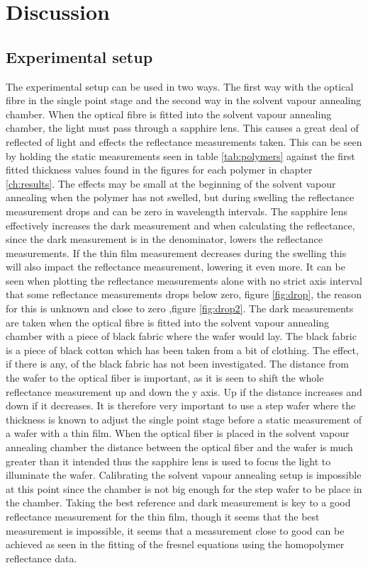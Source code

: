 \documentclass[MasterThesisMain.tex]{subfiles}
\begin{document}
\chapter{Discussion}

\section{Experimental setup}
The experimental setup can be used in two ways. The first way with the optical fibre in the single point stage and the second way in the solvent vapour annealing chamber. When the optical fibre is fitted into the solvent vapour annealing chamber, the light must pass through a sapphire lens. This causes a great deal of reflected of light and effects the reflectance measurements taken. This can be seen by holding the static measurements seen in table \ref{tab:polymers} against the first fitted thickness values found in the figures for each polymer in chapter \ref{ch:results}. The effects may be small at the beginning of the solvent vapour annealing when the polymer has not swelled, but during swelling the reflectance measurement drops and can be zero in wavelength intervals. The sapphire lens effectively increases the dark measurement and when calculating the reflectance, since the dark measurement is in the denominator, lowers the reflectance measurements. If the thin film measurement decreases during the swelling this will also impact the reflectance measurement, lowering it even more. It can be seen when plotting the reflectance measurements alone with no strict axis interval that some reflectance measurements drops below zero, figure \ref{fig:drop}, the reason for this is unknown and close to zero ,figure \ref{fig:drop2}. The dark measurements are taken when the optical fibre is fitted into the solvent vapour annealing chamber with a piece of black fabric where the wafer would lay. The black fabric is a piece of black cotton which has been taken from a bit of clothing. The effect, if there is any, of the black fabric has not been investigated. The distance from the wafer to the optical fiber is important, as it is seen to shift the whole reflectance measurement up and down the y axis. Up if the distance increases and down if it decreases. It is therefore very important to use a step wafer where the thickness is known to adjust the single point stage before a static measurement of a wafer with a thin film. When the optical fiber is placed in the solvent vapour annealing chamber the distance between the optical fiber and the wafer is much greater than it intended thus the sapphire lens is used to focus the light to illuminate the wafer. Calibrating the solvent vapour annealing setup is impossible at this point since the chamber is not big enough for the step wafer to be place in the chamber. Taking the best reference and dark measurement is key to a good reflectance measurement for the thin film, though it seems that the best measurement is impossible, it seems that a measurement close to good can be achieved as seen in the fitting of the fresnel equations using the homopolymer reflectance data.
\end{document}

